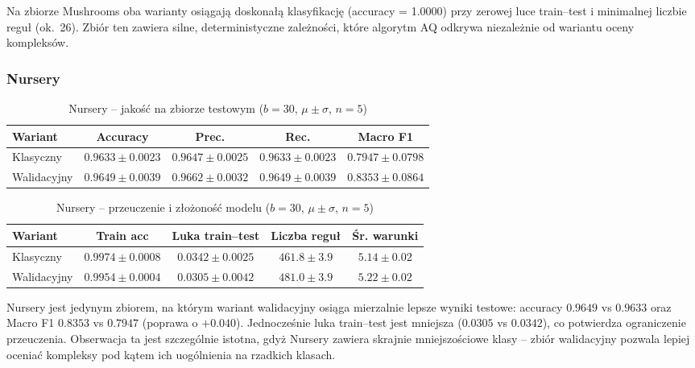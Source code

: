 \documentclass[12pt,a4paper]{article}
\begin{document}
Na zbiorze Mushrooms oba warianty osiągają doskonałą klasyfikację (accuracy = 1.0000)
przy zerowej luce train--test i minimalnej liczbie reguł (ok.\ 26).
Zbiór ten zawiera silne, deterministyczne zależności, które algorytm AQ odkrywa
niezależnie od wariantu oceny kompleksów.

\subsubsection*{Nursery}

\begin{table}[H]
\centering
\caption{Nursery -- jakość na zbiorze testowym ($b=30$, $\mu \pm \sigma$, $n=5$)}
\begin{tabular}{lcccc}
\toprule
Wariant & Accuracy & Prec. & Rec. & Macro F1 \\
\midrule
Klasyczny   & $0.9633 \pm 0.0023$ & $0.9647 \pm 0.0025$ & $0.9633 \pm 0.0023$ & $0.7947 \pm 0.0798$ \\
Walidacyjny & $0.9649 \pm 0.0039$ & $0.9662 \pm 0.0032$ & $0.9649 \pm 0.0039$ & $0.8353 \pm 0.0864$ \\
\bottomrule
\end{tabular}
\end{table}

\begin{table}[H]
\centering
\caption{Nursery -- przeuczenie i złożoność modelu ($b=30$, $\mu \pm \sigma$, $n=5$)}
\begin{tabular}{lcccc}
\toprule
Wariant & Train acc & Luka train--test & Liczba reguł & Śr. warunki \\
\midrule
Klasyczny   & $0.9974 \pm 0.0008$ & $0.0342 \pm 0.0025$ & $461.8 \pm 3.9$ & $5.14 \pm 0.02$ \\
Walidacyjny & $0.9954 \pm 0.0004$ & $0.0305 \pm 0.0042$ & $481.0 \pm 3.9$ & $5.22 \pm 0.02$ \\
\bottomrule
\end{tabular}
\end{table}

Nursery jest jedynym zbiorem, na którym wariant walidacyjny osiąga mierzalnie
lepsze wyniki testowe: accuracy $0.9649$ vs $0.9633$ oraz Macro F1 $0.8353$
vs $0.7947$ (poprawa o $+0.040$). Jednocześnie luka train--test jest mniejsza
($0.0305$ vs $0.0342$), co potwierdza ograniczenie przeuczenia. Obserwacja ta jest
szczególnie istotna, gdyż Nursery zawiera skrajnie mniejszościowe klasy --
zbiór walidacyjny pozwala lepiej oceniać kompleksy pod kątem ich
uogólnienia na rzadkich klasach.
\end{document}
